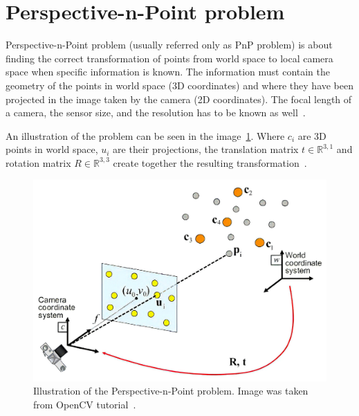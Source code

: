 \documentclass[thesis=B,english]{FITthesis}[2019/12/23]
\begin{document}
    \section{Perspective-n-Point problem} \label{sec:rotTransMat}
        Perspective-n-Point problem (usually referred only as PnP problem) is about finding the correct transformation of points from world space to local camera space when specific information is known. The information must contain the geometry of the points in world space (3D coordinates) and where they have been projected in the image taken by the camera (2D coordinates). The focal length of a camera, the sensor size, and the resolution has to be known as well~\cite{Riba2021}.
        
        An illustration of the problem can be seen in the image~\ref{fig:pnpProblem}. Where \(c_i\) are 3D points in world space, \(u_i\) are their projections, the translation matrix \(t \in \mathbb{R}^{3,1}\) and rotation matrix \(R \in \mathbb{R}^{3,3}\) create together the resulting transformation~\cite{Riba2021}.
        
        \begin{figure}
            \centering
            \includegraphics[width = 0.9\linewidth]{pictures/research/pnp_small.jpg}
            \caption[Illustration of the Perspective-n-Point problem]{Illustration of the Perspective-n-Point problem. Image was taken from OpenCV tutorial~\cite{Riba2021}.}
            \label{fig:pnpProblem}
        \end{figure}   
        
\end{document}
